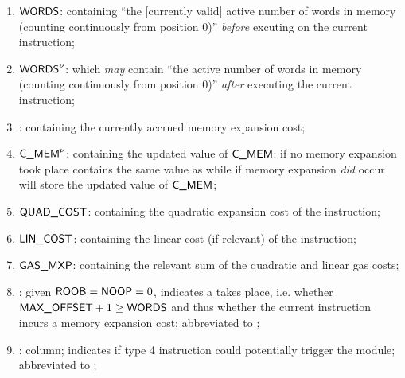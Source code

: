 \begin{enumerate}[resume]
	\item $\textsf{WORDS}$: \godGiven{}
	      \ccc{} containing ``the [currently valid] active number of words in memory (counting continuously from position $0$)'' \emph{before} excuting on the current instruction;
	\item $\textsf{WORDS}^{\nu}$:
	      \ccc{} which \emph{may} contain ``the active number of words in memory (counting continuously from position $0$)'' \emph{after} executing the current instruction;
	\item \expCost:
	      \ccc{} containing the currently accrued memory expansion cost;
	\item $\textsf{C\_MEM}^{\nu}$:
	      \ccc{} containing the updated value of $\textsf{C\_MEM}$: if no memory expansion took place contains the same value as \expCost{} while if memory expansion \emph{did} occur will store the updated value of $\textsf{C\_MEM}$;
	\item $\textsf{QUAD\_COST}$:
	      \ccc{} containing the quadratic expansion cost of the instruction;
	\item $\textsf{LIN\_COST}$:
	      \ccc{} containing the linear cost (if relevant) of the instruction;
	\item $\textsf{GAS}\textsf{\_MXP}$: \godGiven{}
	      \ccc{} containing the relevant sum of the quadratic and linear gas costs;
	\item \mexpEvent{}:
	      given $\textsf{ROOB} = \textsf{NOOP} = 0$, indicates a \MEXPEVENT{} takes place, i.e. whether $\textsf{MAX\_\textsf{OFFSET}} + 1 \geq \textsf{WORDS}$ and thus whether the current instruction incurs a memory expansion cost; abbreviated to \mexpEvent{};
	\item \YNMO{}:
		\godGiven{} column; indicates if type 4 instruction could potentially trigger the \mmuMod{} module;
		abbreviated to \mayTriggerNonTrivialOperation{};
\end{enumerate}

